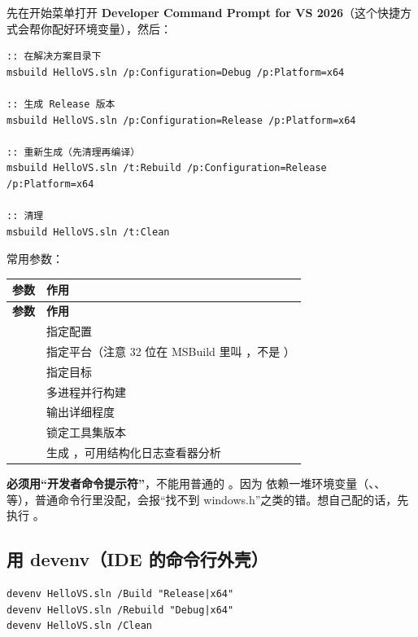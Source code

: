 先在开始菜单打开 \textbf{Developer Command Prompt for VS 2026}（这个快捷方式会帮你配好环境变量），然后：

\begin{lstlisting}[style=shellstyle]
:: 在解决方案目录下
msbuild HelloVS.sln /p:Configuration=Debug /p:Platform=x64

:: 生成 Release 版本
msbuild HelloVS.sln /p:Configuration=Release /p:Platform=x64

:: 重新生成（先清理再编译）
msbuild HelloVS.sln /t:Rebuild /p:Configuration=Release /p:Platform=x64

:: 清理
msbuild HelloVS.sln /t:Clean
\end{lstlisting}

常用参数：

\begin{longtable}{L{6.2cm}L{8.8cm}}\toprule
\textbf{参数} & \textbf{作用} \\ \midrule \endfirsthead
\toprule \textbf{参数} & \textbf{作用} \\ \midrule \endhead
\bottomrule \endlastfoot
{} & 指定配置 \\
 & 指定平台（注意 32 位在 MSBuild 里叫 \textbf{}，不是 ） \\
 & 指定目标 \\
 & 多进程并行构建 \\
 & 输出详细程度 \\
 & 锁定工具集版本 \\
 & 生成 ，可用结构化日志查看器分析 \\
\end{longtable}

\begin{warnbox}[注意]
\textbf{必须用“开发者命令提示符”}，不能用普通的 。因为  依赖一堆环境变量（、、 等），普通命令行里没配，会报“找不到 windows.h”之类的错。想自己配的话，先执行 。
\end{warnbox}

\subsection{用 devenv（IDE 的命令行外壳）}

\begin{lstlisting}[style=shellstyle]
devenv HelloVS.sln /Build "Release|x64"
devenv HelloVS.sln /Rebuild "Debug|x64"
devenv HelloVS.sln /Clean
\end{lstlisting}

